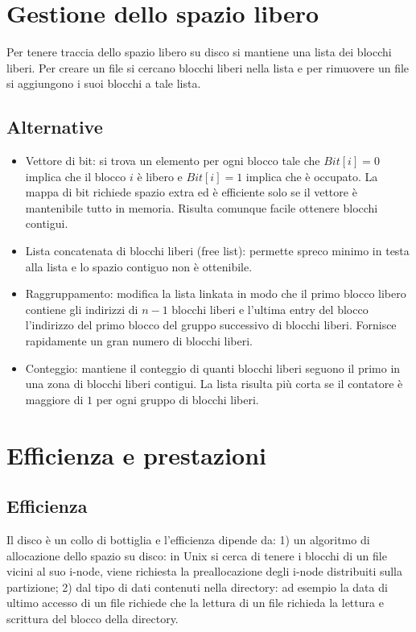 \section{Gestione dello spazio libero}
Per tenere traccia dello spazio libero su disco si mantiene una lista dei blocchi liberi. Per creare un file si cercano blocchi liberi nella lista e per rimuovere un file si aggiungono
i suoi blocchi a tale lista. 
\subsection{Alternative}
\begin{itemize}
	\item Vettore di bit: si trova un elemento per ogni blocco tale che $Bit[i] = 0$ implica che il blocco $i$ \`e libero e $Bit[i] = 1$ implica che \`e occupato. La mappa di bit
		richiede spazio extra ed \`e efficiente solo se il vettore \`e mantenibile tutto in memoria. Risulta comunque facile ottenere blocchi contigui. 
	\item Lista concatenata di blocchi liberi (free list): permette spreco minimo in testa alla lista e lo spazio contiguo non \`e ottenibile.
	\item Raggruppamento: modifica la lista linkata in modo che il primo blocco libero contiene gli indirizzi di $n-1$ blocchi liberi e l'ultima entry del blocco l'indirizzo del
		primo blocco del gruppo successivo di blocchi liberi. Fornisce rapidamente un gran numero di blocchi liberi. 
	\item Conteggio: mantiene il conteggio di quanti blocchi liberi seguono il primo in una zona di blocchi liberi contigui. La lista risulta pi\`u corta se il contatore \`e maggiore
		di $1$ per ogni gruppo di blocchi liberi. 
\end{itemize}
\section{Efficienza e prestazioni}
\subsection{Efficienza}
Il disco \`e un collo di bottiglia e l'efficienza dipende da: 1) un algoritmo di allocazione dello spazio su disco: in Unix si cerca di tenere i blocchi di un file vicini al suo i-node, 
viene richiesta la preallocazione degli i-node distribuiti sulla partizione; 2) dal tipo di dati contenuti nella directory: ad esempio la data di ultimo accesso di un file richiede che la lettura di un
file richieda la lettura e scrittura del blocco della directory. 
